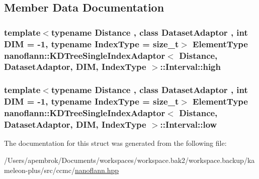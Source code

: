 \subsection{Member Data Documentation}
\hypertarget{structnanoflann_1_1_k_d_tree_single_index_adaptor_1_1_interval_a5b1d4df37a01d6a2154cb89dbd53456e}{
\subsubsection[{high}]{\setlength{\rightskip}{0pt plus 5cm}template$<$typename Distance , class Dataset\-Adaptor , int D\-I\-M = -\/1, typename Index\-Type  = size\-\_\-t$>$ {\bf Element\-Type} {\bf nanoflann\-::\-K\-D\-Tree\-Single\-Index\-Adaptor}$<$ Distance, Dataset\-Adaptor, D\-I\-M, Index\-Type $>$\-::Interval\-::high}}\label{structnanoflann_1_1_k_d_tree_single_index_adaptor_1_1_interval_a5b1d4df37a01d6a2154cb89dbd53456e}
\hypertarget{structnanoflann_1_1_k_d_tree_single_index_adaptor_1_1_interval_a96020845859d090c3f46f1656faeb45d}{
\subsubsection[{low}]{\setlength{\rightskip}{0pt plus 5cm}template$<$typename Distance , class Dataset\-Adaptor , int D\-I\-M = -\/1, typename Index\-Type  = size\-\_\-t$>$ {\bf Element\-Type} {\bf nanoflann\-::\-K\-D\-Tree\-Single\-Index\-Adaptor}$<$ Distance, Dataset\-Adaptor, D\-I\-M, Index\-Type $>$\-::Interval\-::low}}\label{structnanoflann_1_1_k_d_tree_single_index_adaptor_1_1_interval_a96020845859d090c3f46f1656faeb45d}


The documentation for this struct was generated from the following file\-:\begin{DoxyCompactItemize}
\item 
/\-Users/apembrok/\-Documents/workspaces/workspace.\-bak2/workspace.\-backup/kameleon-\/plus/src/ccmc/\hyperlink{nanoflann_8hpp}{nanoflann.\-hpp}\end{DoxyCompactItemize}
